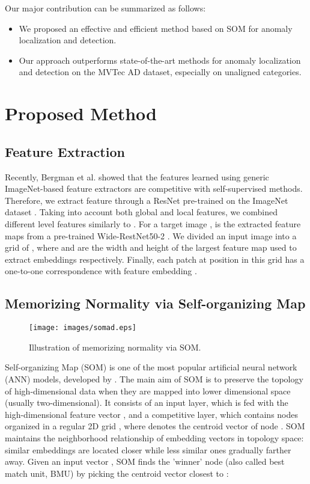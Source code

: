 \documentclass{article}
\begin{document}
Our major contribution can be summarized as follows:
\begin{itemize}
\item We proposed an effective and efficient method based on SOM for anomaly localization and detection. 
\item Our approach outperforms state-of-the-art methods for anomaly localization and detection on the MVTec AD dataset, especially on unaligned categories.
\end{itemize}

\section{Proposed Method}
\label{sec:method}
\subsection{Feature Extraction}
\label{Feature extraction}
Recently, Bergman et al. \cite{Bergman2020DeepNN} showed that the features learned using generic ImageNet-based feature extractors are competitive with self-supervised methods. Therefore, we extract feature through a ResNet pre-trained on the ImageNet dataset \cite{ImageNet}. 
Taking into account both global and local features, we combined different level features similarly to \cite{SPADE}. 
For a target image ,  is the extracted feature maps from a pre-trained Wide-RestNet50-2 \cite{WideResNet}.
We divided an input image into a grid of , where  and  are the width and height of the largest feature map used to extract embeddings respectively. Finally, each patch  at  position in this grid has a one-to-one correspondence with feature embedding .
\subsection{Memorizing Normality via Self-organizing Map}
\label{som}
\begin{figure}[!b]
	\centering
	\texttt{[image: images/somad.eps]}
	\caption{Illustration of memorizing normality via SOM.}
	\label{fig:som}
\end{figure}
Self-organizing Map (SOM) is one of the most popular artificial neural network (ANN) models, developed by \cite{SOM}. The main aim of SOM is to preserve the topology of high-dimensional data when they are mapped into lower dimensional space (usually two-dimensional).
It consists of an input layer, which is fed with the high-dimensional feature vector , and a competitive layer, which contains  nodes organized in a regular 2D grid , where  denotes the centroid vector of node . 
SOM maintains the neighborhood relationship of embedding vectors in topology space: similar embeddings are located closer while less similar ones gradually farther away. 
Given an input vector , SOM finds the 'winner' node  (also called best match unit, BMU) by picking the centroid vector  closest to :
\end{document}
